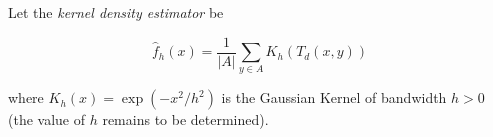 Let the \textit{ kernel density estimator} be

\[   \hat{f}_h(x) = \frac{1}{|A|}\sum_{ y \in A} K_h (T_d(x,y))  \]

 where $K_h(x) = \exp( -x^2/h^2)$ is the Gaussian Kernel of bandwidth $h>0$ (the value of $h$ remains to be determined).


